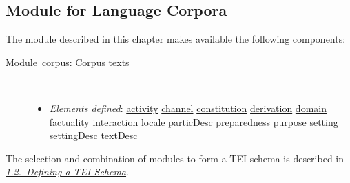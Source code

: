 \subsection[{Module for Language Corpora}]{Module for Language Corpora}\par
The module described in this chapter makes available the following components: \begin{description}

\item[{Module corpus: Corpus texts}]\hspace{1em}\hfill\linebreak
\mbox{}\\[-10pt] \begin{itemize}
\item {\itshape Elements defined}: \hyperref[TEI.activity]{activity} \hyperref[TEI.channel]{channel} \hyperref[TEI.constitution]{constitution} \hyperref[TEI.derivation]{derivation} \hyperref[TEI.domain]{domain} \hyperref[TEI.factuality]{factuality} \hyperref[TEI.interaction]{interaction} \hyperref[TEI.locale]{locale} \hyperref[TEI.particDesc]{particDesc} \hyperref[TEI.preparedness]{preparedness} \hyperref[TEI.purpose]{purpose} \hyperref[TEI.setting]{setting} \hyperref[TEI.settingDesc]{settingDesc} \hyperref[TEI.textDesc]{textDesc}
\end{itemize} 
\end{description}   The selection and combination of modules to form a TEI schema is described in \textit{\hyperref[STIN]{1.2.\ Defining a TEI Schema}}.